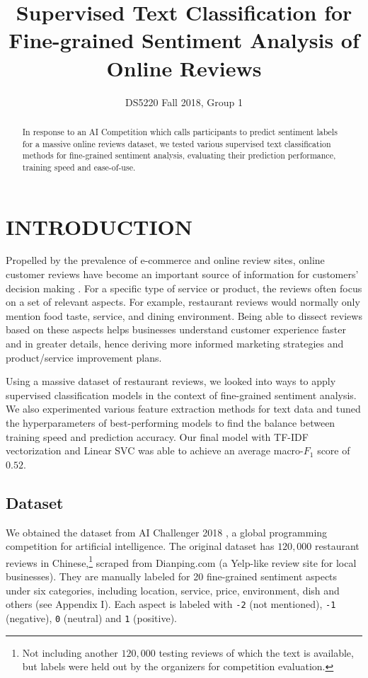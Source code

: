 \documentclass[compsoc]{IEEEtran}
\title{\LARGE \bf
Supervised Text Classification for Fine-grained Sentiment Analysis of Online Reviews 
}
\author{DS5220 Fall 2018, Group 1}%
\begin{document}


\maketitle


\begin{abstract}

In response to an AI Competition which calls participants to predict sentiment labels for a massive online reviews dataset, we tested various supervised text classification methods for fine-grained sentiment analysis, evaluating their prediction performance, training speed and ease-of-use.

\end{abstract}


\section{INTRODUCTION}

Propelled by the prevalence of e-commerce and online review sites, online 
customer reviews have become an important source of information for customers’ decision making \cite{zhang}. For a specific type of service or product, the reviews often focus on a set of relevant aspects. For example, restaurant reviews would normally only mention food taste, service, and dining environment. Being able to dissect reviews based on these aspects helps businesses understand customer experience faster and in greater details, hence deriving more informed marketing strategies and product/service improvement plans.

Using a massive dataset of restaurant reviews, we looked into ways to apply supervised classification models in the context of fine-grained sentiment analysis. We also experimented various feature extraction methods for text data and tuned the hyperparameters of best-performing models to find the balance between training speed and prediction accuracy. Our final model with TF-IDF vectorization and Linear SVC was able to achieve an average macro-$F_1$ score of $0.52$.

\subsection{Dataset}

We obtained the dataset from AI Challenger 2018 \cite{ai-challenger}, a global programming competition for artificial intelligence. The original dataset has $120,000$ restaurant reviews in Chinese,\footnote{Not including another $120,000$ testing reviews of which the text is available, but labels were held out by the organizers for competition evaluation.} scraped from Dianping.com (a Yelp-like review site for local businesses). They are manually labeled for 20 fine-grained sentiment aspects under six categories, including location, service, price, environment, dish and others (see \textit{}{Appendix I}). Each aspect is labeled with \texttt{-2} (not mentioned), \texttt{-1} (negative), \texttt{0} (neutral) and \texttt{1} (positive).
\end{document}
